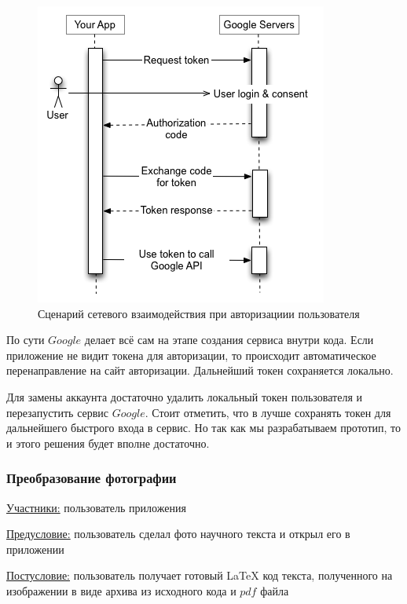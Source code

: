 \begin{figure}
    \includegraphics[scale=0.5]{img/use_cases/authorization.png}
    \caption{Сценарий сетевого взаимодействия при авторизациии пользователя \cite{OAuth_google}}
    \label{auth}
\end{figure}

По сути $Google$ делает всё сам на этапе создания сервиса внутри кода. Если приложение не видит токена для авторизации, то происходит автоматическое перенаправление на сайт авторизации. Дальнейший токен сохраняется локально.

Для замены аккаунта достаточно удалить локальный токен пользователя и перезапустить сервис $Google$. Стоит отметить, что в лучше сохранять токен для дальнейшего быстрого входа в сервис. Но так как мы разрабатываем прототип, то и этого решения будет вполне достаточно.

\subsubsection{Преобразование фотографии}
\underline{Участники:} пользователь приложения

\underline{Предусловие:} пользователь сделал фото научного текста и открыл его в приложении

\underline{Постусловие:} пользователь получает готовый \LaTeX\; код текста, полученного на изображении в виде архива из исходного кода и $pdf$ файла

